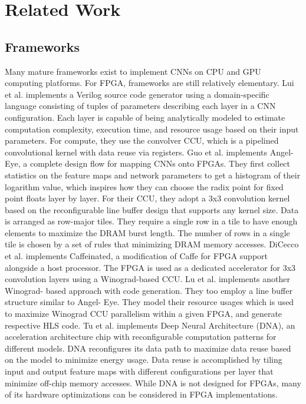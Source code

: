 \chapter{Related Work}

\section{Frameworks}
Many mature frameworks exist to implement CNNs on CPU and GPU computing platforms. For FPGA, frameworks are still relatively elementary. Lui et al. \cite{liu2016automatic} implements a Verilog source code generator using a domain-specific language consisting of tuples of parameters describing each layer in a CNN configuration. Each layer is capable of being analytically modeled to estimate computation complexity, execution time, and resource usage based on their input parameters. For compute, they use the convolver CCU, which is a pipelined convolutional kernel with data reuse via registers. Guo et al. \cite{guo2018angel} implements Angel-Eye, a complete design flow for mapping CNNs onto FPGAs. They first collect statistics on the feature maps and network parameters to get a histogram of their logarithm value, which inspires how they can choose the radix point for fixed point floats layer by layer. For their CCU, they adopt a 3x3 convolution kernel based on the reconfigurable line buffer design \cite{zhang2016caffeine} that supports any kernel size. Data is arranged as row-major tiles. They require a single row in a tile to have enough elements to maximize the DRAM burst length. The number of rows in a single tile is chosen by a set of rules that minimizing DRAM memory accesses. DiCecco et al. \cite{dicecco2016caffeinated} implements Caffeinated, a modification of Caffe for FPGA support alongside a host processor. The FPGA is used as a dedicated accelerator for 3x3 convolution layers using a Winograd-based CCU. Lu et al. \cite{lu2017evaluating} implements another Winograd- based approach with code generation. They too employ a line buffer structure similar to Angel- Eye. They model their resource usages which is used to maximize Winograd CCU parallelism within a given FPGA, and generate respective HLS code. Tu et al. \cite{tu2017deep} implements Deep Neural Architecture (DNA), an acceleration architecture chip with reconfigurable computation patterns for different models. DNA reconfigures its data path to maximize data reuse based on the model to minimize energy usage. Data reuse is accomplished by tiling input and output feature maps with different configurations per layer that minimize off-chip memory accesses. While DNA is not designed for FPGAs, many of its hardware optimizations can be considered in FPGA implementations.

